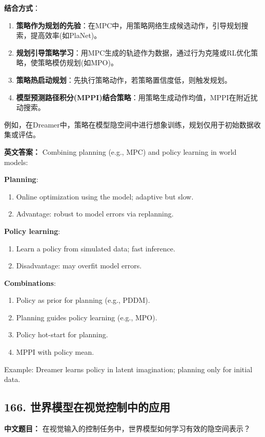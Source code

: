 \documentclass[10pt,a4paper]{ctexart}
\begin{document}
\textbf{结合方式}：
\begin{enumerate}
    \item \textbf{策略作为规划的先验}：在MPC中，用策略网络生成候选动作，引导规划搜索，提高效率(如PlaNet)。
    \item \textbf{规划引导策略学习}：用MPC生成的轨迹作为数据，通过行为克隆或RL优化策略，使策略模仿规划(如MPO)。
    \item \textbf{策略热启动规划}：先执行策略动作，若策略置信度低，则触发规划。
    \item \textbf{模型预测路径积分(MPPI)结合策略}：用策略生成动作均值，MPPI在附近扰动搜索。
\end{enumerate}

例如，在Dreamer中，策略在模型隐空间中进行想象训练，规划仅用于初始数据收集或评估。

\textbf{英文答案：}  
Combining planning (e.g., MPC) and policy learning in world models:

\textbf{Planning}:
\begin{enumerate}
    \item Online optimization using the model; adaptive but slow.
    \item Advantage: robust to model errors via replanning.
\end{enumerate}

\textbf{Policy learning}:
\begin{enumerate}
    \item Learn a policy from simulated data; fast inference.
    \item Disadvantage: may overfit model errors.
\end{enumerate}

\textbf{Combinations}:
\begin{enumerate}
    \item Policy as prior for planning (e.g., PDDM).
    \item Planning guides policy learning (e.g., MPO).
    \item Policy hot-start for planning.
    \item MPPI with policy mean.
\end{enumerate}

Example: Dreamer learns policy in latent imagination; planning only for initial data.

\subsection*{166. 世界模型在视觉控制中的应用}
\textbf{中文题目：} 在视觉输入的控制任务中，世界模型如何学习有效的隐空间表示？
\end{document}
